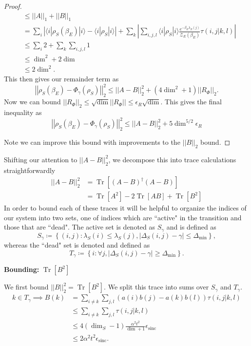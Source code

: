 \documentclass{article}
\newcommand{\ket}[1]{|#1\rangle}
\newcommand{\bra}[1]{\langle #1|}
\newcommand{\brackets}[1]{\left[ #1 \right]}
\newcommand{\abs}[1]{\left| #1 \right|}
\newcommand{\norm}[1]{\left| \left| #1 \right| \right|}
\newcommand{\set}[1]{\left\{ #1 \right\}}
\DeclareMathOperator{\Tr}{Tr}
\newcommand{\trace}[1]{\Tr \brackets{ #1 }}
\newcommand{\partfun}{\mathcal{Z}}
\DeclareMathOperator{\sinc}{sinc}
\begin{document}
\begin{proof}
\begin{align}
    &\leq \norm{A}_1 + \norm{B}_1 \\
    &= \sum_{i} \abs{\bra{i}\rho_S(\beta_E) \ket{i} - \bra{i} \rho_S \ket{i}} + \sum_k \abs{\sum_{i,j,l} \bra{i} \rho_S \ket{i} \frac{e^{-\beta_E \lambda_E(j)}}{\partfun_E(\beta_E)} \tau(i,j | k,l)} \\
    &\leq \sum_i 2 + \sum_k \sum_{i,j,l} 1 \\
    &\leq \dim^2 + 2 \dim \\
    &\leq 2 \dim^2.
\end{align}
This then gives our remainder term as
\begin{equation}
    \norm{\rho_S(\beta_E) - \Phi_{\gamma}(\rho_S)}_2^2 \leq \norm{A - B}_2^2 + (4 \dim^2 + 1) \norm{R_{\Phi}}_2.
\end{equation}
Now we can bound $\norm{R_{\Phi}}_2 \leq \sqrt{\dim} \norm{R_{\Phi}} \leq \epsilon_{R} \sqrt{\dim}$. This gives the final inequality as
\begin{equation}
    \norm{\rho_S(\beta_E) - \Phi_{\gamma}(\rho_S)}_2^2 \leq \norm{A - B}_2^2 + 5 \dim^{5/2} \epsilon_{R}
\end{equation}

Note we can improve this bound with improvements to the $\norm{B}_2$ bound. 
\end{proof}


Shifting our attention to $\norm{A-B}_2^2$, we decompose this into trace calculations straightforwardly
\begin{align}
    \norm{A-B}_2^2 &= \trace{(A-B)^\dagger (A-B)} \\
    &= \trace{A^2} - 2 \trace{AB} + \trace{B^2}
\end{align}
In order to bound each of these traces it will be helpful to organize the indices of our system into two sets, one of indices which are ``active" in the transition and those that are ``dead". The active set is denoted as $S_{\gamma}$ and is defined as
\begin{equation}
    S_{\gamma} \coloneqq \set{(i,j) : \lambda_S(i) \leq \lambda_S(j), |\Delta_S(i,j) - \gamma| \leq \Delta_{\min}},
\end{equation}
whereas the ``dead" set is denoted and defined as
\begin{equation}
T_{\gamma} \coloneqq \set{i : \forall j, |\Delta_S(i,j) - \gamma| \geq \Delta_{\min}}. 
\end{equation}


\noindent \textbf{Bounding: }$\trace{B^2}$


We first bound $\norm{B}_2^2 = \trace{B^2}$. We split this trace into sums over $S_{\gamma}$ and $T_{\gamma}$. 
\begin{align}
    k \in T_{\gamma} \implies B(k) &= \sum_{i \neq k} \sum_{j,l} (a(i) b(j) - a(k) b(l)) \tau(i,j|k,l) \\
    &\leq \sum_{i \neq k} \sum_{j,l} \tau(i,j|k,l) \\
    &\leq 4 (\dim_S - 1) \frac{\alpha^2 t^2}{\dim + 1}\epsilon_{\sinc} \\
    &\leq 2 \alpha^2 t^2 \epsilon_{\sinc}.
\end{align}
\end{document}
